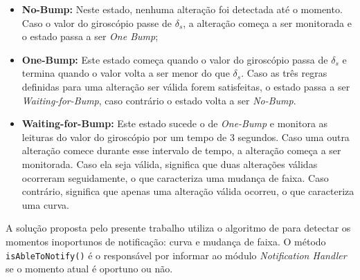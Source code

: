 \begin{itemize}
  \item \textbf{No-Bump:} Neste estado, nenhuma alteração foi detectada até o momento. Caso o valor do giroscópio passe de $\delta_{s}$, a alteração começa a ser
  monitorada e o estado passa a ser \textit{One Bump};
  \item \textbf{One-Bump:} Este estado começa quando o valor do giroscópio passa de $\delta_{s}$ e termina quando o valor volta a ser menor do que $\delta_{s}$.
  Caso as três regras definidas para uma alteração ser válida forem satisfeitas, o estado passa a ser \textit{Waiting-for-Bump}, caso contrário o estado volta
  a ser \textit{No-Bump}.
  \item \textbf{Waiting-for-Bump:} Este estado sucede o de \textit{One-Bump} e monitora as leituras do valor do giroscópio por um tempo de 3 segundos. Caso
  uma outra alteração comece durante esse intervalo de tempo, a alteração começa a ser monitorada. Caso ela seja válida, significa que duas alterações válidas
  ocorreram seguidamente, o que caracteriza uma mudança de faixa. Caso contrário, significa que apenas uma alteração válida ocorreu, o que caracteriza uma curva.
\end{itemize}

A solução proposta pelo presente trabalho utiliza o algoritmo de  para detectar os momentos inoportunos de notificação: curva
e mudança de faixa. O método \lstinline[basicstyle=\ttfamily\color{black}]|isAbleToNotify()| é o responsável por informar ao módulo \textit{Notification Handler}
se o momento atual é oportuno ou não.
